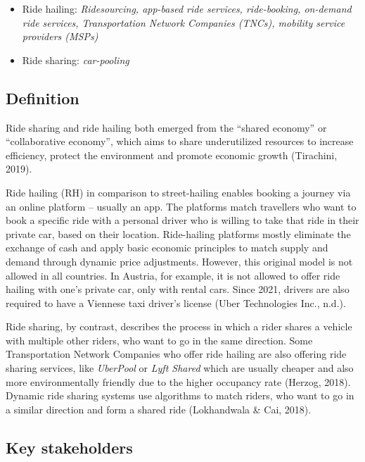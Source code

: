 \documentclass[
]{book}
\providecommand{\tightlist}{%
  \setlength{\itemsep}{0pt}\setlength{\parskip}{0pt}}
\begin{document}
\begin{itemize}
\tightlist
\item
  Ride hailing: \emph{Ridesourcing, app-based ride services, ride-booking, on-demand ride services, Transportation Network Companies (TNCs), mobility service providers (MSPs)}
\item
  Ride sharing: \emph{car-pooling}
\end{itemize}

\hypertarget{definition-45}{%
\subsection*{Definition}\label{definition-45}}

Ride sharing and ride hailing both emerged from the ``shared economy'' or ``collaborative economy'', which aims to share underutilized resources to increase efficiency, protect the environment and promote economic growth (Tirachini, 2019).

Ride hailing (RH) in comparison to street-hailing enables booking a journey via an online platform -- usually an app. The platforms match travellers who want to book a specific ride with a personal driver who is willing to take that ride in their private car, based on their location. Ride-hailing platforms mostly eliminate the exchange of cash and apply basic economic principles to match supply and demand through dynamic price adjustments. However, this original model is not allowed in all countries. In Austria, for example, it is not allowed to offer ride hailing with one's private car, only with rental cars. Since 2021, drivers are also required to have a Viennese taxi driver's license (Uber Technologies Inc., n.d.).

Ride sharing, by contrast, describes the process in which a rider shares a vehicle with multiple other riders, who want to go in the same direction. Some Transportation Network Companies who offer ride hailing are also offering ride sharing services, like \emph{UberPool} or \emph{Lyft Shared} which are usually cheaper and also more environmentally friendly due to the higher occupancy rate (Herzog, 2018). Dynamic ride sharing systems use algorithms to match riders, who want to go in a similar direction and form a shared ride (Lokhandwala \& Cai, 2018).

\hypertarget{key-stakeholders-45}{%
\subsection*{Key stakeholders}\label{key-stakeholders-45}}
\end{document}
